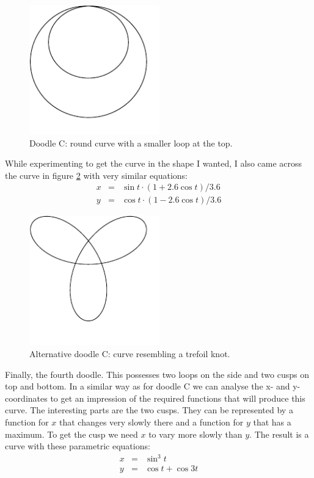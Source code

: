 \documentclass[onecolumn]{article}
\begin{document}
\begin{figure}[H]
\caption{Doodle C: round curve with a smaller loop at the top.}
\label{doodle_c}
\begin{center}
\includegraphics[width=0.5\textwidth]{doodle_c.pdf}
\end{center}
\end{figure}

While experimenting to get the curve in the shape I wanted, I also came across the curve in figure \ref{doodle_c2} with very similar equations:
\begin{eqnarray}
\nonumber x &=& \sin t \cdot (1 + 2.6 \cos t) / 3.6 \\
\nonumber y &=& \cos t \cdot (1 - 2.6 \cos t) / 3.6
\end{eqnarray}

\begin{figure}[H]
\caption{Alternative doodle C: curve resembling a trefoil knot.}
\label{doodle_c2}
\begin{center}
\includegraphics[width=0.5\textwidth]{doodle_c2.pdf}
\end{center}
\end{figure}

Finally, the fourth doodle. This possesses two loops on the side and two cusps on top and bottom. In a similar way as for doodle C we
can analyse the x- and y-coordinates to get an impression of the required functions that will produce this curve. The interesting parts are
the two cusps. They can be represented by a function for $x$ that changes very slowly there and a function for $y$ that has a maximum.
To get the cusp we need $x$ to vary more slowly than $y$. The result is a curve with these parametric equations:
\begin{eqnarray}
\nonumber x &=& \sin ^3 t \\
\nonumber y &=& \cos t + \cos 3t
\end{eqnarray}
\end{document}
